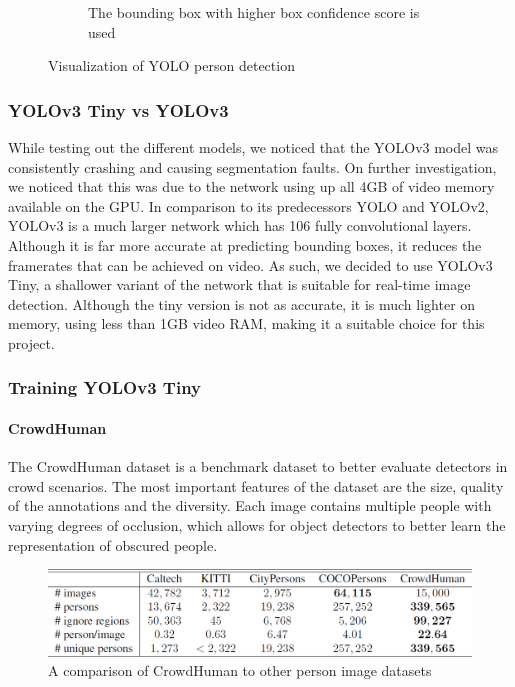 \begin{figure}[ht]
\begin{subfigure}[b]{.45\textwidth}
		\caption{The bounding box with higher box confidence score is used}
	\end{subfigure}
	\vspace{-1\baselineskip}
	\begin{center}
		\caption{Visualization of YOLO person detection}
		\label{fig:yoloViz}
	\end{center}
	\vspace{-2\baselineskip}
\end{figure}

\subsubsection{YOLOv3 Tiny vs YOLOv3}
While testing out the different models, we noticed that the YOLOv3 model was consistently crashing and causing segmentation faults. On further investigation, we noticed that this was due to the network using up all 4GB of video memory available on the GPU. In comparison to its predecessors YOLO and YOLOv2, YOLOv3 is a much larger network which has 106 fully convolutional layers. Although it is far more accurate at predicting bounding boxes, it reduces the framerates that can be achieved on video. As such, we decided to use YOLOv3 Tiny, a shallower variant of the network that is suitable for real-time image detection. Although the tiny version is not as accurate, it is much lighter on memory, using less than 1GB video RAM, making it a suitable choice for this project.

\subsubsection{Training YOLOv3 Tiny}
\paragraph{CrowdHuman} The CrowdHuman dataset \cite{Shao} is a benchmark dataset to better evaluate detectors in crowd scenarios. The most important features of the dataset are the size, quality of the annotations and the diversity. Each image contains multiple people with varying degrees of occlusion, which allows for object detectors to better learn the representation of obscured people. 

\begin{figure}[ht]
	\centering
	\includegraphics[width=0.8\linewidth]{img/chapter5_implementation/crowdHumanStats.png}
	\caption{A comparison of CrowdHuman to other person image datasets \cite{Shao}}
	\label{fig:crowdHumanStats}
\end{figure}

